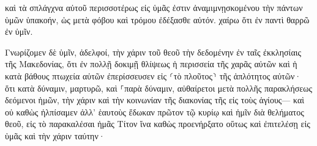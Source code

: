 \documentclass{openreader}
\begin{document}
καὶ τὰ σπλάγχνα αὐτοῦ περισσοτέρως εἰς ὑμᾶς ἐστιν ἀναμιμνῃσκομένου τὴν πάντων ὑμῶν ὑπακοήν, ὡς μετὰ φόβου καὶ τρόμου ἐδέξασθε αὐτόν. 
χαίρω ὅτι ἐν παντὶ θαρρῶ ἐν ὑμῖν. 

Γνωρίζομεν δὲ ὑμῖν, ἀδελφοί, τὴν χάριν τοῦ θεοῦ τὴν δεδομένην ἐν ταῖς ἐκκλησίαις τῆς Μακεδονίας, 
ὅτι ἐν πολλῇ δοκιμῇ θλίψεως ἡ περισσεία τῆς χαρᾶς αὐτῶν καὶ ἡ κατὰ βάθους πτωχεία αὐτῶν ἐπερίσσευσεν εἰς ⸂τὸ πλοῦτος⸃ τῆς ἁπλότητος αὐτῶν· 
ὅτι κατὰ δύναμιν, μαρτυρῶ, καὶ ⸀παρὰ δύναμιν, αὐθαίρετοι 
μετὰ πολλῆς παρακλήσεως δεόμενοι ἡμῶν, τὴν χάριν καὶ τὴν κοινωνίαν τῆς διακονίας τῆς εἰς τοὺς ἁγίους— 
καὶ οὐ καθὼς ἠλπίσαμεν ἀλλ’ ἑαυτοὺς ἔδωκαν πρῶτον τῷ κυρίῳ καὶ ἡμῖν διὰ θελήματος θεοῦ, 
εἰς τὸ παρακαλέσαι ἡμᾶς Τίτον ἵνα καθὼς προενήρξατο οὕτως καὶ ἐπιτελέσῃ εἰς ὑμᾶς καὶ τὴν χάριν ταύτην· 
\end{document}
